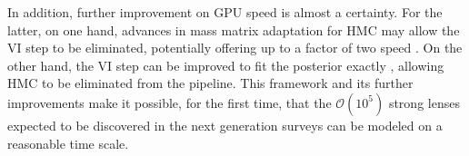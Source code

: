 


 In addition, further improvement on GPU speed is almost a certainty. For the latter, on one hand, advances in mass matrix adaptation for HMC \citep{stan} may allow the VI step to be eliminated, potentially offering up to a factor of two speed . 
On the other hand, the VI step can be improved to fit the posterior exactly \citep{kingma2017a,papamakarios2018}, allowing HMC to be eliminated from the pipeline. 
This framework and its further improvements make it possible, for the first time, that the $\mathcal{O}(10^5)$ strong lenses expected to be discovered in the next generation surveys can be modeled on a reasonable time scale.


